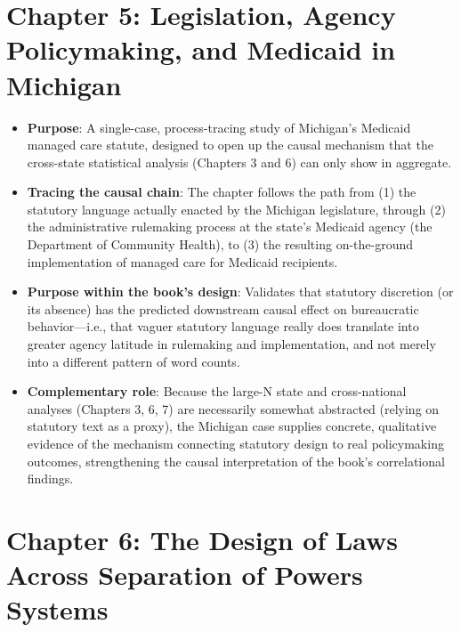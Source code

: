 \documentclass[12pt]{article}
\begin{document}
\section{Chapter 5: Legislation, Agency Policymaking, and Medicaid in Michigan}

\begin{itemize}[leftmargin=*, itemsep=4pt]
    \item \textbf{Purpose}: A single-case, process-tracing study of Michigan's Medicaid managed care statute, designed to open up the causal mechanism that the cross-state statistical analysis (Chapters 3 and 6) can only show in aggregate.
    \item \textbf{Tracing the causal chain}: The chapter follows the path from (1) the statutory language actually enacted by the Michigan legislature, through (2) the administrative rulemaking process at the state's Medicaid agency (the Department of Community Health), to (3) the resulting on-the-ground implementation of managed care for Medicaid recipients.
    \item \textbf{Purpose within the book's design}: Validates that statutory discretion (or its absence) has the predicted downstream causal effect on bureaucratic behavior---i.e., that vaguer statutory language really does translate into greater agency latitude in rulemaking and implementation, and not merely into a different pattern of word counts.
    \item \textbf{Complementary role}: Because the large-N state and cross-national analyses (Chapters 3, 6, 7) are necessarily somewhat abstracted (relying on statutory text as a proxy), the Michigan case supplies concrete, qualitative evidence of the mechanism connecting statutory design to real policymaking outcomes, strengthening the causal interpretation of the book's correlational findings.
\end{itemize}

\section{Chapter 6: The Design of Laws Across Separation of Powers Systems}
\end{document}
